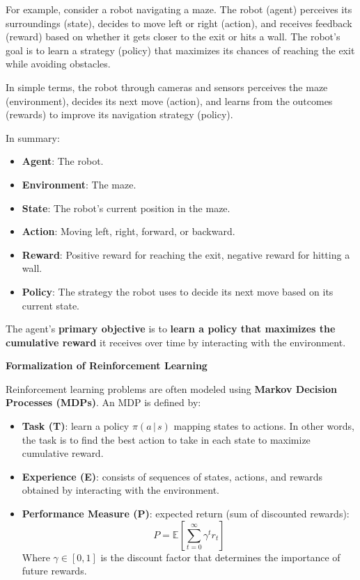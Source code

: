 \begin{examplebox}
    For example, consider a robot navigating a maze. The robot (agent) perceives its surroundings (state), decides to move left or right (action), and receives feedback (reward) based on whether it gets closer to the exit or hits a wall. The robot's goal is to learn a strategy (policy) that maximizes its chances of reaching the exit while avoiding obstacles.

    \highspace
    In simple terms, the robot through cameras and sensors perceives the maze (environment), decides its next move (action), and learns from the outcomes (rewards) to improve its navigation strategy (policy).

    \highspace
    In summary:
    \begin{itemize}
        \item \textbf{Agent}: The robot.
        \item \textbf{Environment}: The maze.
        \item \textbf{State}: The robot's current position in the maze.
        \item \textbf{Action}: Moving left, right, forward, or backward.
        \item \textbf{Reward}: Positive reward for reaching the exit, negative reward for hitting a wall.
        \item \textbf{Policy}: The strategy the robot uses to decide its next move based on its current state.
    \end{itemize}
\end{examplebox}

\noindent
The agent's \textbf{primary objective} is to \textbf{learn a policy that maximizes the cumulative reward} it receives over time by interacting with the environment.

\highspace
\begin{flushleft}
    \textcolor{Green3}{ \textbf{Formalization of Reinforcement Learning}}
\end{flushleft}
Reinforcement learning problems are often modeled using \textbf{Markov Decision Processes (MDPs)}. An MDP is defined by:
\begin{itemize}
    \item \textbf{Task (T)}: learn a policy $\pi\left(a \, | \, s\right)$ mapping states to actions. In other words, the task is to find the best action to take in each state to maximize cumulative reward.
    \item \textbf{Experience (E)}: consists of sequences of states, actions, and rewards obtained by interacting with the environment.
    \item \textbf{Performance Measure (P)}: expected return (sum of discounted rewards):
    \begin{equation*}
        P = \mathbb{E}\left[\sum_{t=0}^{\infty} \gamma^t r_t\right]
    \end{equation*}
    Where $\gamma \in \left[0, 1\right]$ is the discount factor that determines the importance of future rewards.
\end{itemize}

